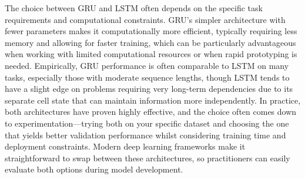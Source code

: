 The choice between GRU and LSTM often depends on the specific task requirements and computational constraints. GRU's simpler architecture with fewer parameters makes it computationally more efficient, typically requiring less memory and allowing for faster training, which can be particularly advantageous when working with limited computational resources or when rapid prototyping is needed. Empirically, GRU performance is often comparable to LSTM on many tasks, especially those with moderate sequence lengths, though LSTM tends to have a slight edge on problems requiring very long-term dependencies due to its separate cell state that can maintain information more independently. In practice, both architectures have proven highly effective, and the choice often comes down to experimentation—trying both on your specific dataset and choosing the one that yields better validation performance whilst considering training time and deployment constraints. Modern deep learning frameworks make it straightforward to swap between these architectures, so practitioners can easily evaluate both options during model development.

